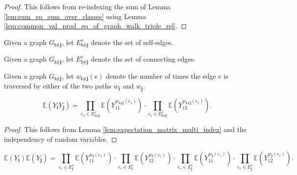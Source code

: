 \begin{proof}
  This follows from re-indexing the sum of Lemma \ref{lem:sum_eq_sum_over_classes} using Lemma \ref{lem:common_val_prod_eq_of_graph_walk_triple_rel}.
\end{proof}
\begin{definition}
  \notready
  \label{def:graph_walk_triple_single_edges}
  Given a graph $G_{\mathbf{i} \# \mathbf{j}}$, let $E^s_{\mathbf{i} \# \mathbf{j}}$ denote the set of self-edges.
\end{definition}
\begin{definition}
  \notready
  \label{def:graph_walk_triple_repeated_edges}
  Given a graph $G_{\mathbf{i} \# \mathbf{j}}$, let $E^c_{\mathbf{i} \# \mathbf{j}}$ denote the set of connecting edges.
\end{definition}
\begin{definition}
  \notready
  \label{def:edgeCountPair}
  Given a graph $G_{\mathbf{i} \# \mathbf{j}}$, 
  let $w_{\mathbf{i} \# \mathbf{j}}(e)$ denote the number of times the edge $e$ is traversed by either of the two paths $w_\mathbf{i}$ and $w_\mathbf{j}$.
\end{definition}
\begin{lemma}
  \notready
  \label{lem:expect_mul_eq_prod_expect_edgewise_of_indep}
  \[
  \mathbb{E} (Y_\mathbf{i}Y_\mathbf{j}) 
  = \prod_{e_s \in E^s_{\mathbf{i} \# \mathbf{j}}} \mathbb{E} (Y_{11}^{w_{\mathbf{i} \# \mathbf{j}}(e_s)}) \cdot \prod_{e_c \in E^c_{\mathbf{i} \# \mathbf{j}}} \mathbb{E} (Y_{12}^{w_{\mathbf{i} \# \mathbf{j}}(e_c)}).
  \]
\end{lemma}
\begin{proof}
  This follows from Lemma \ref{lem:expectation_matrix_multi_index} and the independency of random variables.
\end{proof}
\begin{lemma}
  \notready
  \label{lem:expect_mul_eq_prod_expect_edgewise_mul_prod_expect_edgewise}
  \[
  \mathbb{E}(Y_\mathbf{i}) \mathbb{E}(Y_\mathbf{j}) 
  = \prod_{e_s \in E^s_{\mathbf{i}}} \mathbb{E} (Y_{11}^{w_{\mathbf{i}}(e_s)}) \cdot \prod_{e_c \in E^c_{\mathbf{i}}} \mathbb{E} (Y_{12}^{w_{\mathbf{i}}(e_c)})
  \cdot \prod_{e_s \in E^s_{\mathbf{j}}} \mathbb{E} (Y_{11}^{w_{\mathbf{j}}(e_s)}) \cdot \prod_{e_c \in E^c_{\mathbf{j}}} \mathbb{E} (Y_{12}^{w_{\mathbf{j}}(e_c)}).
  \]
\end{lemma}
